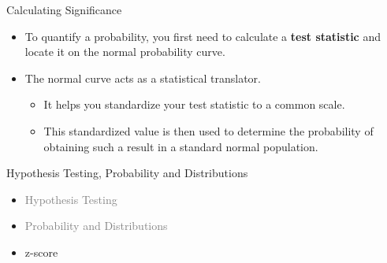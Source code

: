 \documentclass[
  ignorenonframetext,
]{beamer}
\providecommand{\tightlist}{%
  \setlength{\itemsep}{0pt}\setlength{\parskip}{0pt}}
\begin{document}
\begin{frame}{Calculating Significance}
\label{calculating-significance}
\begin{itemize}
\tightlist
\item
  To quantify a probability, you first need to calculate a \textbf{test
  statistic} and locate it on the normal probability curve.
\end{itemize}

\begin{itemize}
\tightlist
\item
  The normal curve acts as a statistical translator.

  \begin{itemize}
  \tightlist
  \item
    It helps you standardize your test statistic to a common scale.
  \item
    This standardized value is then used to determine the probability of
    obtaining such a result in a standard normal population.
  \end{itemize}
\end{itemize}
\end{frame}

\begin{frame}{Hypothesis Testing, Probability and Distributions}
\label{hypothesis-testing-probability-and-distributions-2}
\begin{itemize}
\tightlist
\item
  \textcolor{gray}{Hypothesis Testing}
\end{itemize}

\begin{itemize}
\tightlist
\item
  \textcolor{gray}{Probability and Distributions}
\end{itemize}

\begin{itemize}
\tightlist
\item
  z-score
\end{itemize}
\end{frame}
\end{document}
